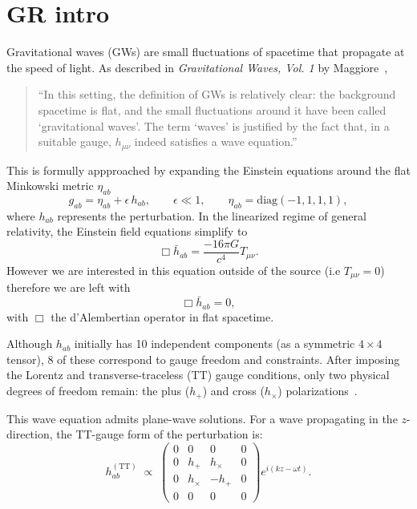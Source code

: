 \documentclass[11pt]{article}
\begin{document}
\section{GR intro}
Gravitational waves (GWs) are small fluctuations of spacetime that propagate at the speed of light. As described in \textit{Gravitational Waves, Vol. 1} by Maggiore~\cite[p.~29]{GRbook},
\begin{quote}
“In this setting, the definition of GWs is relatively clear: the background spacetime is flat, and the small fluctuations around it have been called ‘gravitational waves’. The term ‘waves’ is justified by the fact that, in a suitable gauge, \(h_{\mu\nu}\) indeed satisfies a wave equation.”
\end{quote}
This is formully appproached by expanding the Einstein equations around the flat Minkowski metric $\eta _{a b}$ 
\begin{equation}
g_{ab} = \eta_{ab} + \epsilon\,h_{ab},
\qquad
\epsilon \ll 1,
\qquad
\eta_{ab} = \mathrm{diag}(-1, 1, 1, 1),
\end{equation}
where \(h_{ab}\) represents the perturbation. In the linearized regime of general relativity, the Einstein field equations simplify to
\begin{equation}
    \Box \bar{h}_{ab} = \frac{-16\pi G}{c^4} T_{\mu \nu}.
\end{equation}
However we are interested in this equation outside of the source (i.e $T_{\mu \nu} =0$) therefore we are left with 
\begin{equation}
    \Box \bar{h}_{ab} = 0, 
\end{equation}
with \(\Box\) the d’Alembertian operator in flat spacetime.

\noindent
Although \(h_{ab}\) initially has 10 independent components (as a symmetric $4 \times 4$ tensor), 8 of these correspond to gauge freedom and constraints. After imposing the Lorentz and transverse-traceless (TT) gauge conditions, only two physical degrees of freedom remain: the plus (\(h_+\)) and cross (\(h_\times\)) polarizations~\cite[Sec.~1.2]{GRbook}.

\noindent
This wave equation admits plane-wave solutions. For a wave propagating in the \(z\)-direction, the TT-gauge form of the perturbation is:
\begin{equation}
h_{ab}^{(\mathrm{TT})} \;\propto\;
\begin{pmatrix}
0 & 0 & 0 & 0 \\
0 & h_+ & h_\times & 0 \\
0 & h_\times & -h_+ & 0 \\
0 & 0 & 0 & 0
\end{pmatrix}
e^{i(kz-\omega t)}.
\end{equation}
\end{document}
